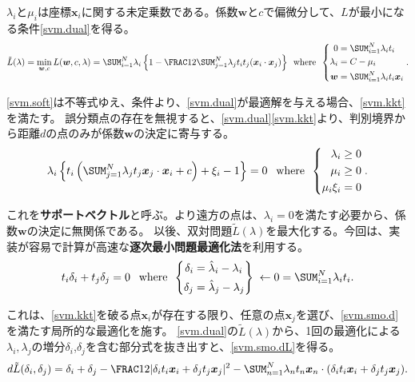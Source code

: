 \documentclass[10pt,a4paper]{book}
\begin{document}
$\lambda_i$と$\mu_i$は座標$\bm{x}_i$に関する未定乗数である。係数$\bm{w}$と$c$で偏微分して、$L$が最小になる条件\eqref{svm.dual}を得る。
%
\begin{equation}
\label{eq:svm.dual}
\tilde{L}(\lambda)
= \min_{\bm{w},c} L(\bm{w},c, \lambda)
= \sum_{i=1}^N \lambda_i \seq{1 - \frac{1}{2} \sum_{j=1}^N \lambda_j t_i t_j (\dprod{\bm{x}_i}{\bm{x}_j})}
\where\left\{
\begin{aligned}
0         &= \sum_{i=1}^N \lambda_i t_i \\
\lambda_i &= C - \mu_i\\
\bm{w}    &= \sum_{i=1}^N \lambda_i t_i \bm{x}_i
\end{aligned}
\right..
\end{equation}

\eqref{svm.soft}は不等式ゆえ、\KKT 条件より、\eqref{svm.dual}が最適解を与える場合、\eqref{svm.kkt}を満たす。
誤分類点の存在を無視すると、\eqref{svm.dual}\eqref{svm.kkt}より、判別境界から距離$d$の点のみが係数$\bm{w}$の決定に寄与する。
%
\begin{equation}
\label{eq:svm.kkt}
\lambda_i \seq{t_i\left(\sum_{j=1}^N \lambda_j t_j \dprod{\bm{x}_j}{\bm{x}_i} + c\right) + \xi_i - 1} = 0\;
\where\left\{
\begin{aligned}
\lambda_i &\geq 0 \\
\mu_i     &\geq 0 \\
\mu_i\xi_i&=0
\end{aligned}
\right..
\end{equation}

これを\textbf{サポートベクトル}と呼ぶ。より遠方の点は、$\lambda_i\!=\!0$を満たす必要から、係数$\bm{w}$の決定に無関係である。
以後、双対問題$\tilde{L}(\lambda)$を最大化する。今回は、実装が容易で計算が高速な\textbf{逐次最小問題最適化法}を利用する。
%
\begin{equation}
\label{eq:svm.smo.d}
t_i \delta_i + t_j \delta_j = 0\;
\where \left\{
\begin{aligned}
\delta_i &= \hat{\lambda}_i - \lambda_i \\
\delta_j &= \hat{\lambda}_j - \lambda_j
\end{aligned}
\right\}\;
\leftarrow 0 = \sum_{i=1}^N \lambda_i t_i.
\end{equation}

これは、\eqref{svm.kkt}を破る点$\bm{x}_i$が存在する限り、任意の点$\bm{x}_j$を選び、\eqref{svm.smo.d}を満たす局所的な最適化を施す。
\eqref{svm.dual}の$\tilde{L}(\lambda)$から、1回の最適化による$\lambda_i,\lambda_j$の増分$\delta_i$,$\delta_j$を含む部分式を抜き出すと、\eqref{svm.smo.dL}を得る。
%
\begin{equation}
\label{eq:svm.smo.dL}
d\tilde{L}(\delta_i, \delta_j) =
\delta_i +\delta_j -
\frac{1}{2} |\delta_i t_i \bm{x}_i + \delta_j t_j \bm{x}_j|^2 -
\sum_{n=1}^N \lambda_n t_n \dprod{\bm{x}_n}{(\delta_i t_i \bm{x}_i + \delta_j t_j \bm{x}_j)}.
\end{equation}
\end{document}
